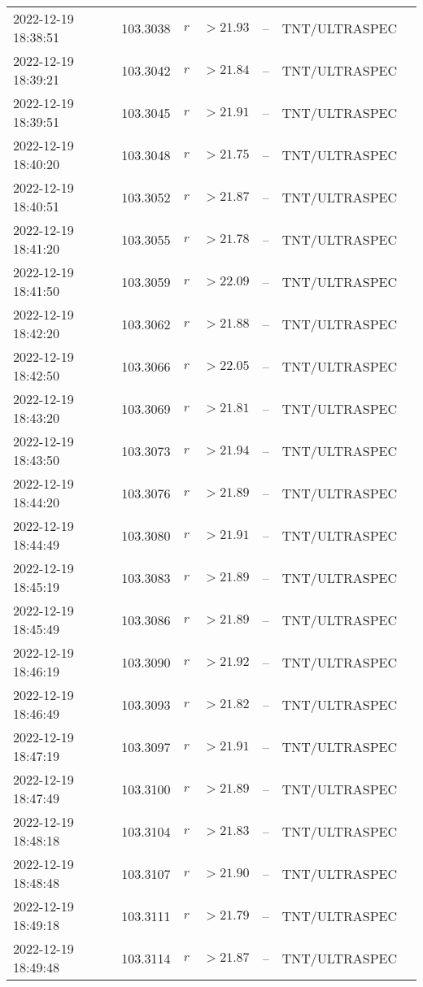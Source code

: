 \documentclass{nature_plusfigure}
\begin{document}
\begin{supplement}
\begin{center}
\begin{longtable}{lllllll}
2022-12-19 18:38:51 & 103.3038 & $r$ & $>21.93$ & -- & TNT/ULTRASPEC &  \\ 
2022-12-19 18:39:21 & 103.3042 & $r$ & $>21.84$ & -- & TNT/ULTRASPEC &  \\ 
2022-12-19 18:39:51 & 103.3045 & $r$ & $>21.91$ & -- & TNT/ULTRASPEC &  \\ 
2022-12-19 18:40:20 & 103.3048 & $r$ & $>21.75$ & -- & TNT/ULTRASPEC &  \\ 
2022-12-19 18:40:51 & 103.3052 & $r$ & $>21.87$ & -- & TNT/ULTRASPEC &  \\ 
2022-12-19 18:41:20 & 103.3055 & $r$ & $>21.78$ & -- & TNT/ULTRASPEC &  \\ 
2022-12-19 18:41:50 & 103.3059 & $r$ & $>22.09$ & -- & TNT/ULTRASPEC &  \\ 
2022-12-19 18:42:20 & 103.3062 & $r$ & $>21.88$ & -- & TNT/ULTRASPEC &  \\ 
2022-12-19 18:42:50 & 103.3066 & $r$ & $>22.05$ & -- & TNT/ULTRASPEC &  \\ 
2022-12-19 18:43:20 & 103.3069 & $r$ & $>21.81$ & -- & TNT/ULTRASPEC &  \\ 
2022-12-19 18:43:50 & 103.3073 & $r$ & $>21.94$ & -- & TNT/ULTRASPEC &  \\ 
2022-12-19 18:44:20 & 103.3076 & $r$ & $>21.89$ & -- & TNT/ULTRASPEC &  \\ 
2022-12-19 18:44:49 & 103.3080 & $r$ & $>21.91$ & -- & TNT/ULTRASPEC &  \\ 
2022-12-19 18:45:19 & 103.3083 & $r$ & $>21.89$ & -- & TNT/ULTRASPEC &  \\ 
2022-12-19 18:45:49 & 103.3086 & $r$ & $>21.89$ & -- & TNT/ULTRASPEC &  \\ 
2022-12-19 18:46:19 & 103.3090 & $r$ & $>21.92$ & -- & TNT/ULTRASPEC &  \\ 
2022-12-19 18:46:49 & 103.3093 & $r$ & $>21.82$ & -- & TNT/ULTRASPEC &  \\ 
2022-12-19 18:47:19 & 103.3097 & $r$ & $>21.91$ & -- & TNT/ULTRASPEC &  \\ 
2022-12-19 18:47:49 & 103.3100 & $r$ & $>21.89$ & -- & TNT/ULTRASPEC &  \\ 
2022-12-19 18:48:18 & 103.3104 & $r$ & $>21.83$ & -- & TNT/ULTRASPEC &  \\ 
2022-12-19 18:48:48 & 103.3107 & $r$ & $>21.90$ & -- & TNT/ULTRASPEC &  \\ 
2022-12-19 18:49:18 & 103.3111 & $r$ & $>21.79$ & -- & TNT/ULTRASPEC &  \\ 
2022-12-19 18:49:48 & 103.3114 & $r$ & $>21.87$ & -- & TNT/ULTRASPEC &  \\ 

\end{longtable}
\end{center}
\end{supplement}
\end{document}

